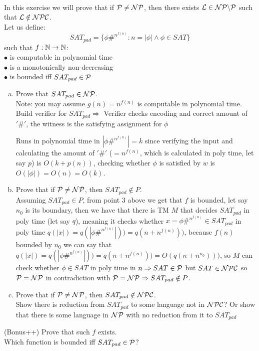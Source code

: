  \\
In this exercise we will prove that if $\mathcal{P} \neq \mathcal{N}\mathcal{P}$, then there exists $\mathcal{L} \in \mathcal{N}\mathcal{P} \backslash \mathcal{P}$
such that $\mathcal{L} \notin \mathcal{N}\mathcal{P}\mathcal{C}$. \\
Let us define:
\[
    SAT_{pad} = \{\phi \#^{n^{f(n)}} : n = |\phi| \wedge \phi \in SAT\}
\]
such that $f: \mathbb{N} \rightarrow \mathbb{N}$: \\
$\bullet$ is computable in polynomial time \\
$\bullet$ is a monotonically non-decreasing \\
$\bullet$ is bounded iff $SAT_{pad} \in \mathcal{P}$

\begin{enumerate}[(a)]
    \item Prove that $SAT_{pad} \in \mathcal{N}\mathcal{P}$. \\
          Note: you may assume $g(n) = n^{f(n)}$ is computable in polynomial time. \\

          Build verifier for $SAT_{pad} \Rightarrow$ Verifier checks encoding and correct
          amount of $'\#'$, the witness is the satisfying assignment for $\phi$

          Runs in polynomial time in $|\phi \#^{n^{f(n)}}|=k$ since verifying the input and
          calculating the amount of $'\#'$ ($=n^{f(n)}$, which is calculated in poly time, let say $p$)
          is $O(k+p(n))$, checking whether $\phi$ is satisfied by $w$ is $O(|\phi|) = O(n) = O(k)$. \\

    \item Prove that if $\mathcal{P} \neq \mathcal{N}\mathcal{P}$, then $SAT_{pad} \notin P$. \\

          Assuming $SAT_{pad} \in P$, from point 3 above we get that $f$ is bounded, let say $n_0$ is its boundary,
          then we have that there is TM $M$ that decides $SAT_{pad}$ in poly time (let say $q$), meaning it checks whether
          $x = \phi \#^{n^{f(n)}} \in SAT_{pad}$ in poly time $q(|x|) = q(|\phi \#^{n^{f(n)}}|)) = q(n+n^{f(n)}))$,
          because $f(n)$ bounded by $n_0$ we can say that $q(|x|) = q(|\phi \#^{n^{f(n)}}|)) = q(n+n^{f(n)})) = O(q(n+n^{n_0})))$,
          so $M$ can check whether $\phi \in SAT$ in poly time in $n \Rightarrow SAT \in \mathcal{P}$ but $SAT \in \mathcal{N}\mathcal{P}\mathcal{C}$ so $\mathcal{P} = \mathcal{N}\mathcal{P}$
          in contradiction with $\mathcal{P} = \mathcal{N}\mathcal{P} \Rightarrow SAT_{pad} \notin P$. \\

    \item Prove that if $\mathcal{P} \neq \mathcal{N}\mathcal{P}$, then $SAT_{pad} \notin \mathcal{N}\mathcal{P}\mathcal{C}$. \\

          Show there is reduction from $SAT_{pad}$ to some language not in $\mathcal{N}\mathcal{P}\mathcal{C}$?
          Or show that there is some language in $\mathcal{N}\mathcal{P}$ with no reduction from it to $SAT_{pad}$
\end{enumerate}


(Bonus++) Prove that such $f$ exists. \\

Which function is bounded iff $SAT_{pad} \in \mathcal{P}$?